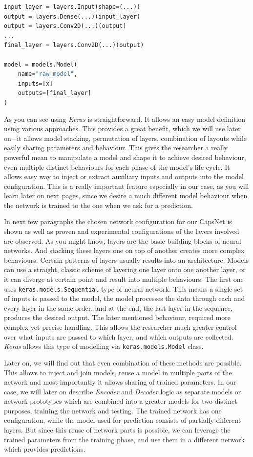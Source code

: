 \clearpage
\begin{lstlisting}[language=Python, caption=Keras model functional definition.]
input_layer = layers.Input(shape=(...))
output = layers.Dense(...)(input_layer)
output = layers.Conv2D(...)(output)
...
final_layer = layers.Conv2D(...)(output)

model = models.Model(
    name="raw_model",
    inputs=[x]
    outputs=[final_layer]
)
\end{lstlisting}

As you can see using \textit{Keras} is straightforward. It allows an easy model definition using various approaches. This provides a great benefit, which we will use later on\,--\,it allows model stacking, permutation of layers, combination of layouts while easily sharing parameters and behaviour. This gives the researcher a really powerful mean to manipulate a model and shape it to achieve desired behaviour, even multiple distinct behaviours for each phase of the model's life cycle. It allows easy way to inject or extract auxiliary inputs and outputs into the model configuration. This is a really important feature especially in our case, as you will learn later on next pages, since we desire a much different model behaviour when the network is trained to the one when we ask for a prediction.

In next few paragraphs the chosen network configuration for our CapsNet is shown as well as proven and experimental configurations of the layers involved are observed. As you might know, layers are the basic building blocks of neural networks. And stacking these layers one on top of another creates more complex behaviours. Certain patterns of layers usually results into an architecture. Models can use a straight, classic scheme of layering one layer onto one another layer, or it can diverge at certain point and result into multiple behaviours. The first one uses \texttt{keras.models.Sequential} type of neural network. This means a single set of inputs is passed to the model, the model processes the data through each and every layer in the same order, and at the end, the last layer in the sequence, produces the desired output. The later mentioned behaviour, required more complex yet precise handling. This allows the researcher much greater control over what inputs are passed to which layer, and which outputs are collected. \textit{Keras} allows this type of modelling via \texttt{keras.models.Model} class.

Later on, we will find out that even combination of these methods are possible. This allows to inject and join models, reuse a model in multiple parts of the network and most importantly it allows sharing of trained parameters. In our case, we will later on describe \textit{Encoder} and \textit{Decoder} logic as separate models or network prototypes which are combined into a greater models for two distinct purposes, training the network and testing. The trained network has one configuration, while the model used for prediction consists of partially different layers. But since this reuse of network parts is possible, we can leverage the trained parameters from the training phase, and use them in a different network which provides predictions.

